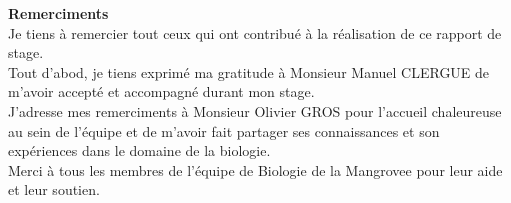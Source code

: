 \vspace*{\fill}
    \begin{center}
        \textbf{\large{Remerciments}} \\[2cm]

        Je tiens à remercier tout ceux qui ont contribué à la réalisation de ce rapport de stage. \\[0.5cm]

        Tout d'abod, je tiens exprimé ma gratitude à Monsieur Manuel CLERGUE de m'avoir accepté et accompagné durant mon stage. \\[0.5cm]

        J'adresse mes remerciments à Monsieur Olivier GROS pour l'accueil chaleureuse au sein de l'équipe et de m'avoir fait partager ses connaissances et son expériences dans le domaine de la biologie. \\[0.5cm]

        Merci à tous les membres de l'équipe de Biologie de la Mangrovee pour leur aide et leur soutien. \\[0.5cm]

    \end{center}
\vspace*{\fill}